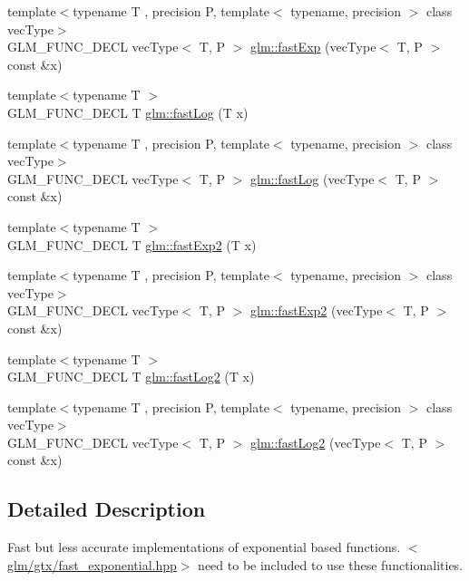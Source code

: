\begin{DoxyCompactItemize}
\item 
{\footnotesize template$<$typename T , precision P, template$<$ typename, precision $>$ class vec\-Type$>$ }\\G\-L\-M\-\_\-\-F\-U\-N\-C\-\_\-\-D\-E\-C\-L vec\-Type$<$ T, P $>$ \hyperlink{group__gtx__fast__exponential_ga4faf0b61115de36efcf47c4ecb55a5fa}{glm\-::fast\-Exp} (vec\-Type$<$ T, P $>$ const \&x)
\item 
{\footnotesize template$<$typename T $>$ }\\G\-L\-M\-\_\-\-F\-U\-N\-C\-\_\-\-D\-E\-C\-L T \hyperlink{group__gtx__fast__exponential_gae1bdc97b7f96a600e29c753f1cd4388a}{glm\-::fast\-Log} (T x)
\item 
{\footnotesize template$<$typename T , precision P, template$<$ typename, precision $>$ class vec\-Type$>$ }\\G\-L\-M\-\_\-\-F\-U\-N\-C\-\_\-\-D\-E\-C\-L vec\-Type$<$ T, P $>$ \hyperlink{group__gtx__fast__exponential_ga789abcbc34d08008d2f5a4547dd6e5e3}{glm\-::fast\-Log} (vec\-Type$<$ T, P $>$ const \&x)
\item 
{\footnotesize template$<$typename T $>$ }\\G\-L\-M\-\_\-\-F\-U\-N\-C\-\_\-\-D\-E\-C\-L T \hyperlink{group__gtx__fast__exponential_ga0af50585955eb14c60bb286297fabab2}{glm\-::fast\-Exp2} (T x)
\item 
{\footnotesize template$<$typename T , precision P, template$<$ typename, precision $>$ class vec\-Type$>$ }\\G\-L\-M\-\_\-\-F\-U\-N\-C\-\_\-\-D\-E\-C\-L vec\-Type$<$ T, P $>$ \hyperlink{group__gtx__fast__exponential_ga9e6219327b7a33077dbec7620d981fff}{glm\-::fast\-Exp2} (vec\-Type$<$ T, P $>$ const \&x)
\item 
{\footnotesize template$<$typename T $>$ }\\G\-L\-M\-\_\-\-F\-U\-N\-C\-\_\-\-D\-E\-C\-L T \hyperlink{group__gtx__fast__exponential_ga6e98118685f6dc9e05fbb13dd5e5234e}{glm\-::fast\-Log2} (T x)
\item 
{\footnotesize template$<$typename T , precision P, template$<$ typename, precision $>$ class vec\-Type$>$ }\\G\-L\-M\-\_\-\-F\-U\-N\-C\-\_\-\-D\-E\-C\-L vec\-Type$<$ T, P $>$ \hyperlink{group__gtx__fast__exponential_gabc46086fe6636b8be87f09e6c5d2bb58}{glm\-::fast\-Log2} (vec\-Type$<$ T, P $>$ const \&x)
\end{DoxyCompactItemize}


\subsection{Detailed Description}
Fast but less accurate implementations of exponential based functions. $<$\hyperlink{fast__exponential_8hpp}{glm/gtx/fast\-\_\-exponential.\-hpp}$>$ need to be included to use these functionalities. 

